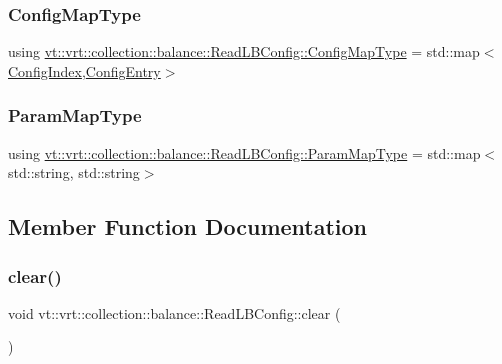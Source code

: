 \subsubsection{\texorpdfstring{Config\+Map\+Type}{ConfigMapType}}
{\footnotesize\ttfamily using \hyperlink{structvt_1_1vrt_1_1collection_1_1balance_1_1_read_l_b_config_ad7babe539cf2171b9a9cee642b36a965}{vt\+::vrt\+::collection\+::balance\+::\+Read\+L\+B\+Config\+::\+Config\+Map\+Type} =  std\+::map$<$\hyperlink{namespacevt_1_1vrt_1_1collection_1_1balance_ac1bb9eee8129549177880dbb4e5f6a34}{Config\+Index},\hyperlink{structvt_1_1vrt_1_1collection_1_1balance_1_1_config_entry}{Config\+Entry}$>$}

\mbox{\label{structvt_1_1vrt_1_1collection_1_1balance_1_1_read_l_b_config_a539bba2e8e767f2aa9923c6616088404}} 
\subsubsection{\texorpdfstring{Param\+Map\+Type}{ParamMapType}}
{\footnotesize\ttfamily using \hyperlink{structvt_1_1vrt_1_1collection_1_1balance_1_1_read_l_b_config_a539bba2e8e767f2aa9923c6616088404}{vt\+::vrt\+::collection\+::balance\+::\+Read\+L\+B\+Config\+::\+Param\+Map\+Type} =  std\+::map$<$std\+::string, std\+::string$>$}



\subsection{Member Function Documentation}
\mbox{\label{structvt_1_1vrt_1_1collection_1_1balance_1_1_read_l_b_config_a12418b6d3b3a6e9538810bf58d570dec}} 
\subsubsection{\texorpdfstring{clear()}{clear()}}
{\footnotesize\ttfamily void vt\+::vrt\+::collection\+::balance\+::\+Read\+L\+B\+Config\+::clear (\begin{DoxyParamCaption}{ }\end{DoxyParamCaption})\hspace{0.3cm}{\ttfamily [static]}}

